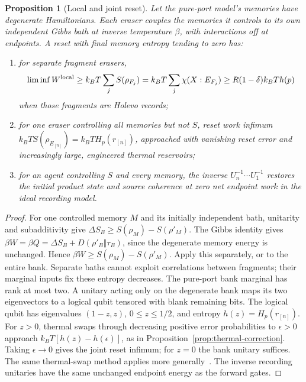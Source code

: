 \documentclass[12pt,a4paper]{article}
\newtheorem{proposition}[theorem]{Proposition}
\begin{document}
\begin{proposition}[Local and joint reset]
\label{prop:erasure}
Let the pure-port model's memories have degenerate Hamiltonians. Each
eraser couples the memories it controls to its own independent Gibbs
bath at inverse temperature \(\beta\), with interactions off at endpoints.
A reset with final memory entropy tending to zero has:
\begin{enumerate}
\item for separate fragment erasers,
\[
 \liminf W^{\rm local}\ge k_BT\sum_jS(\rho_{F_j})
 =k_BT\sum_j\chi(X:E_{F_j})
 \ge R(1-\delta)k_BT h(p)
\]
when those fragments are Holevo records;
\item for one eraser controlling all memories but not \(S\), reset
work infimum \(k_BT S(\rho_{E_{[n]}})=k_BT H_p(r_{[n]})\),
approached with vanishing reset error and increasingly large,
engineered thermal reservoirs;
\item for an agent controlling \(S\) and every memory, the inverse
\(U_n^{-1}\cdots U_1^{-1}\) restores the initial product state and
source coherence at zero net endpoint work in the ideal recording model.
\end{enumerate}
\end{proposition}
\begin{proof}
For one controlled memory \(M\) and its initially independent bath,
unitarity and subadditivity give
\(\Delta S_B\ge S(\rho_M)-S(\rho'_M)\).
The Gibbs identity gives
\(\beta W=\beta Q=\Delta S_B+D(\rho'_B\Vert\tau_B)\),
since the degenerate memory energy is unchanged. Hence
\(\beta W\ge S(\rho_M)-S(\rho'_M)\). Apply this separately, or
to the entire bank. Separate baths cannot exploit correlations between
fragments; their marginal inputs fix these entropy decreases.
The pure-port bank marginal has rank at most two. A unitary acting only
on the degenerate bank maps its two eigenvectors to a logical qubit
tensored with blank remaining bits. The logical qubit has eigenvalues
\((1-z,z)\), \(0\le z\le1/2\), and entropy \(h(z)=H_p(r_{[n]})\).
For \(z>0\), thermal swaps through decreasing positive error probabilities
to \(\epsilon>0\) approach \(k_BT[h(z)-h(\epsilon)]\), as in
Proposition~\ref{prop:thermal-correction}. Taking \(\epsilon\to0\)
gives the joint reset infimum; for \(z=0\) the bank unitary suffices.
The same thermal-swap method applies more generally~\cite{ReebWolf2014}.
The inverse recording unitaries have the same unchanged endpoint
energy as the forward gates.
\end{proof}
\end{document}
